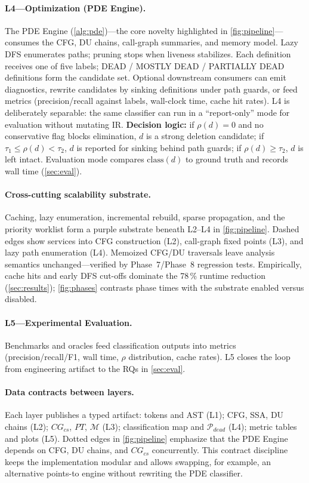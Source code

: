 \documentclass[acmsmall,screen,review,anonymous]{acmart}
\begin{document}
\paragraph{L4---Optimization (PDE Engine).}
The PDE Engine (\autoref{alg:pde})---the core novelty highlighted in \autoref{fig:pipeline}---consumes the CFG, DU chains, call-graph summaries, and memory model. Lazy DFS enumerates paths; pruning stops when liveness stabilizes. Each definition receives one of five labels; DEAD / MOSTLY DEAD / PARTIALLY DEAD definitions form the candidate set. Optional downstream consumers can emit diagnostics, rewrite candidates by sinking definitions under path guards, or feed metrics (precision/recall against labels, wall-clock time, cache hit rates). L4 is deliberately separable: the same classifier can run in a ``report-only'' mode for evaluation without mutating IR.
\textbf{Decision logic:} if $\rho(d)=0$ and no conservative flag blocks elimination, $d$ is a strong deletion candidate; if $\tau_1\le\rho(d)<\tau_2$, $d$ is reported for sinking behind path guards; if $\rho(d)\ge\tau_2$, $d$ is left intact. Evaluation mode compares $\mathrm{class}(d)$ to ground truth and records wall time (\autoref{sec:eval}).

\paragraph{Cross-cutting scalability substrate.}
Caching, lazy enumeration, incremental rebuild, sparse propagation, and the priority worklist form a purple substrate beneath L2--L4 in \autoref{fig:pipeline}. Dashed edges show services into CFG construction (L2), call-graph fixed points (L3), and lazy path enumeration (L4). Memoized CFG/DU traversals leave analysis semantics unchanged---verified by Phase~7/Phase~8 regression tests. Empirically, cache hits and early DFS cut-offs dominate the 78\,\% runtime reduction (\autoref{sec:results}); \autoref{fig:phases} contrasts phase times with the substrate enabled versus disabled.

\paragraph{L5---Experimental Evaluation.}
Benchmarks and oracles feed classification outputs into metrics (precision/recall/F1, wall time, $\rho$ distribution, cache rates). L5 closes the loop from engineering artifact to the RQs in \autoref{sec:eval}.

\paragraph{Data contracts between layers.}
Each layer publishes a typed artifact: tokens and AST (L1); CFG, SSA, DU chains (L2); $CG_{cs}$, $PT$, $\mathcal{M}$ (L3); classification map and $\mathcal{P}_{dead}$ (L4); metric tables and plots (L5). Dotted edges in \autoref{fig:pipeline} emphasize that the PDE Engine depends on CFG, DU chains, and $CG_{cs}$ concurrently. This contract discipline keeps the implementation modular and allows swapping, for example, an alternative points-to engine without rewriting the PDE classifier.
\end{document}
